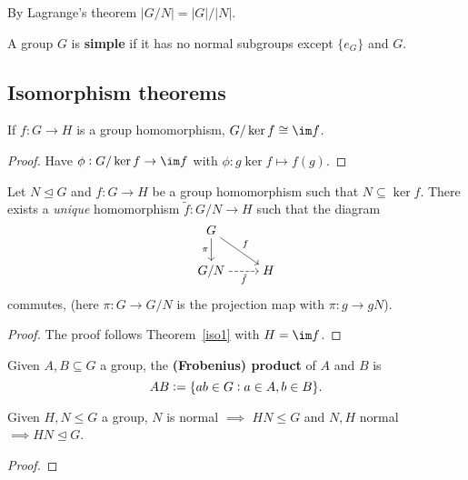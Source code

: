 \documentclass[../Year2.tex]{subfiles}
\begin{document}
\begin{remark}
    By Lagrange's theorem $|G/N| = |G|/|N|$.
\end{remark}

\begin{definition}
    A group $G$ is \textbf{simple} if it has no normal subgroups except $\{e_G\}$ and $G$.
\end{definition}

\subsection{Isomorphism theorems}

\begin{theorem}\label{iso1}
    If $f:G\rightarrow H$ is a group homomorphism, $G/\ker f\cong \im f$.

    \begin{proof}
        Have $\phi:G/\ker f\rightarrow \im f$ with $\phi:g\ker f\mapsto f(g)$.
    \end{proof}
\end{theorem}

\begin{theorem}
    Let $N\unlhd G$ and $f:G\rightarrow H$ be a group homomorphism such that $N\subseteq \ker f$. There exists a \textit{unique} homomorphism $\tilde{f}:G/N\rightarrow H$ such that the diagram \[
        \begin{tikzcd}[cramped]
            G \arrow[d, swap, "\pi"] \arrow[rd, "f"]\\
            G/N \arrow[r, dashed, swap, "\tilde{f}"] & H
        \end{tikzcd}
    \] commutes, (here $\pi:G\rightarrow G/N$ is the projection map with $\pi:g\rightarrow gN$).

    \begin{proof}
        The proof follows Theorem~\ref{iso1} with $H=\im f$.
    \end{proof}
\end{theorem}

\begin{definition}
    Given $A,B\subseteq G$ a group, the \textbf{(Frobenius) product} of $A$ and $B$ is \[
        AB := \{ab\in G: a\in A, b\in B\}
    \text{\textcolor{black}{.}}
    \]
    \vspace{-20pt}
\end{definition}

\begin{lemma}
    Given $H,N\leq G$ a group, $N$ is normal $\implies$ $HN\leq G$ and $N,H$ normal $\implies HN\unlhd G$.
    \begin{proof}
        
    \end{proof}
\end{lemma}
\end{document}
